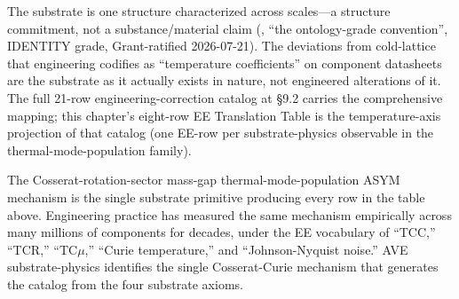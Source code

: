 \noindent
The substrate is one structure characterized across scales---a structure commitment, not a substance/material claim (, ``the ontology-grade convention'', IDENTITY grade, Grant-ratified 2026-07-21). The deviations from cold-lattice that engineering codifies as ``temperature coefficients'' on component datasheets are the substrate as it actually exists in nature, not engineered alterations of it. The full 21-row engineering-correction catalog at  \S 9.2 carries the comprehensive mapping; this chapter's eight-row EE Translation Table is the temperature-axis projection of that catalog (one EE-row per substrate-physics observable in the thermal-mode-population family).

The Cosserat-rotation-sector mass-gap thermal-mode-population ASYM mechanism is the single substrate primitive producing every row in the table above. Engineering practice has measured the same mechanism empirically across many millions of components for decades, under the EE vocabulary of ``TCC,'' ``TCR,'' ``TC$\mu$,'' ``Curie temperature,'' and ``Johnson-Nyquist noise.'' AVE substrate-physics identifies the single Cosserat-Curie mechanism that generates the catalog from the four substrate axioms.
